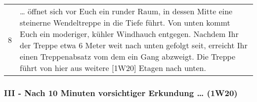 \documentclass[11pt]{wbzine}
\begin{document}
\begin{tabularx}{\columnwidth}{cZ}
8 & \ldots{} öffnet sich vor Euch ein runder Raum, in dessen Mitte
eine steinerne Wendeltreppe in die Tiefe führt. Von unten kommt Euch
ein moderiger, kühler Windhauch entgegen. Nachdem Ihr der Treppe
etwa 6 Meter weit nach unten gefolgt seit, erreicht Ihr einen
Treppenabsatz vom dem ein Gang abzweigt. Die Treppe führt von hier
aus weitere [1W20] Etagen nach unten.\\

\end{tabularx}

\subsubsection{III - Nach 10 Minuten vorsichtiger Erkundung \ldots{} (1W20)}
\end{document}
